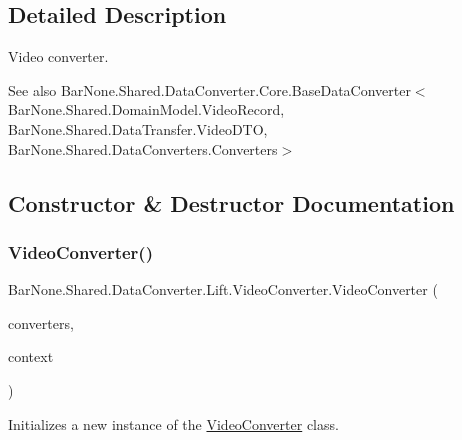 \subsection{Detailed Description}
Video converter. 

\begin{DoxySeeAlso}{See also}
Bar\+None.\+Shared.\+Data\+Converter.\+Core.\+Base\+Data\+Converter$<$\+Bar\+None.\+Shared.\+Domain\+Model.\+Video\+Record, Bar\+None.\+Shared.\+Data\+Transfer.\+Video\+D\+T\+O, Bar\+None.\+Shared.\+Data\+Converters.\+Converters$>$


\end{DoxySeeAlso}


\subsection{Constructor \& Destructor Documentation}
\mbox{\label{class_bar_none_1_1_shared_1_1_data_converter_1_1_lift_1_1_video_converter_afc4428e83f194730d07decd293f3e334}} 
\subsubsection{\texorpdfstring{Video\+Converter()}{VideoConverter()}}
{\footnotesize\ttfamily Bar\+None.\+Shared.\+Data\+Converter.\+Lift.\+Video\+Converter.\+Video\+Converter (\begin{DoxyParamCaption}\item[{\mbox{\hyperlink{class_bar_none_1_1_shared_1_1_data_converters_1_1_converters}{Converters}}}]{converters,  }\item[{\mbox{\hyperlink{interface_bar_none_1_1_shared_1_1_core_1_1_i_domain_context}{I\+Domain\+Context}}}]{context }\end{DoxyParamCaption})}



Initializes a new instance of the \mbox{\hyperlink{class_bar_none_1_1_shared_1_1_data_converter_1_1_lift_1_1_video_converter}{Video\+Converter}} class. 


